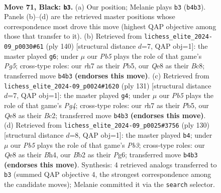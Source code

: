 \documentclass[11pt]{article}
\begin{document}
\clearpage

\begin{figure}[p]\centering
\begin{subfigure}{0.46\textwidth}\centering
\resizebox{\linewidth}{!}{%
\newchessgame
\chessboard[
  setfen={4q3/7R/8/8/1p6/3k1B2/1b6/5K2 b - - 33 71},
  showmover=false,
  pgfstyle=straightmove, color=movearrow, markmove={b4-b3}
]}
\caption{}
\end{subfigure}\hfill
\begin{subfigure}{0.46\textwidth}\centering
\resizebox{\linewidth}{!}{%
\newchessgame
\chessboard[
  setfen={2B5/8/8/1Pb1k1P1/8/3K4/8/8 w - - 1 71},
  showmover=false,
  pgfstyle=straightmove, color=movearrow, markmove={g5-g6}
]}
\caption{}
\end{subfigure}
\\[4pt]
\begin{subfigure}{0.46\textwidth}\centering
\resizebox{\linewidth}{!}{%
\newchessgame
\chessboard[
  setfen={8/5k2/8/1p2K1p1/1B6/8/2b5/8 b - - 1 66},
  showmover=false,
  pgfstyle=straightmove, color=movearrow, markmove={g5-g4}
]}
\caption{}
\end{subfigure}\hfill
\begin{subfigure}{0.46\textwidth}\centering
\resizebox{\linewidth}{!}{%
\newchessgame
\chessboard[
  setfen={5b2/3k4/6P1/8/7B/1P3K2/8/8 w - - 3 66},
  showmover=false,
  pgfstyle=straightmove, color=movearrow, markmove={b3-b4}
]}
\caption{}
\end{subfigure}
\caption{\textbf{Move 71, Black: \texttt{b3}.} (a) Our position; Melanie plays \texttt{b3} (\texttt{b4b3}). Panels (b)--(d) are the retrieved master positions whose correspondence most drove this move (highest QAP objective among those that transfer to it). (b) Retrieved from \texttt{lichess\_elite\_2024-09\_p0030\#61} (ply 140) [structural distance $d$=7, QAP obj=1]: the master played \texttt{g6}; under $\mu$ our \emph{Pb5} plays the role of that game's \emph{Pg5}; cross-type roles: our \emph{r}h7 as their \emph{P}b5, our \emph{Q}e8 as their \emph{B}c8; transferred move \texttt{b4b3} \textbf{(endorses this move)}. (c) Retrieved from \texttt{lichess\_elite\_2024-09\_p0024\#1620} (ply 131) [structural distance $d$=7, QAP obj=1]: the master played \texttt{g4}; under $\mu$ our \emph{Pb5} plays the role of that game's \emph{Pg4}; cross-type roles: our \emph{r}h7 as their \emph{P}b5, our \emph{Q}e8 as their \emph{B}c2; transferred move \texttt{b4b3} \textbf{(endorses this move)}. (d) Retrieved from \texttt{lichess\_elite\_2024-09\_p0025\#3756} (ply 130) [structural distance $d$=8, QAP obj=1]: the master played \texttt{b4}; under $\mu$ our \emph{Pb5} plays the role of that game's \emph{Pb3}; cross-type roles: our \emph{Q}e8 as their \emph{B}h4, our \emph{B}b2 as their \emph{P}g6; transferred move \texttt{b4b3} \textbf{(endorses this move)}. Synthesis: 4 retrieved analogs transferred to \texttt{b3} (summed QAP objective 4, the strongest correspondence among the candidate moves); Melanie committed it via the \texttt{search} selector.}
\label{fig:thought-m141}
\end{figure}
\end{document}
